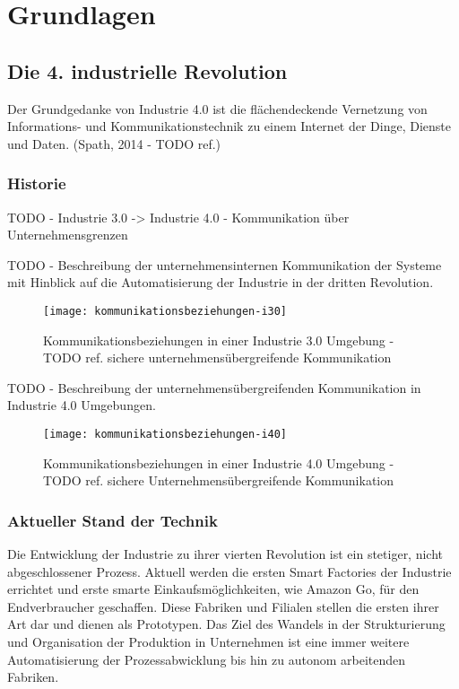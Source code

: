 \chapter{Grundlagen}

\section{Die 4. industrielle Revolution}

Der Grundgedanke von Industrie 4.0 ist die flächendeckende Vernetzung von Informations- und Kommunikationstechnik zu einem Internet der Dinge, Dienste und Daten. (Spath, 2014 - TODO ref.)

\subsection{Historie}
TODO - Industrie 3.0 -> Industrie 4.0 - Kommunikation über Unternehmensgrenzen

TODO - Beschreibung der unternehmensinternen Kommunikation der Systeme mit Hinblick auf die Automatisierung der Industrie in der dritten Revolution.

\begin{figure}[h]
  \centering
  \texttt{[image: kommunikationsbeziehungen-i30]}
  \caption{Kommunikationsbeziehungen in einer Industrie 3.0 Umgebung - TODO ref. sichere unternehmensübergreifende Kommunikation}
  \label{Kap2:Industrie3.0-Kommunikation}
\end{figure}

\clearpage

TODO - Beschreibung der unternehmensübergreifenden Kommunikation in Industrie 4.0 Umgebungen.

\begin{figure}[h]
  \centering
  \texttt{[image: kommunikationsbeziehungen-i40]}
  \caption{Kommunikationsbeziehungen in einer Industrie 4.0 Umgebung - TODO ref. sichere Unternehmensübergreifende Kommunikation}
  \label{Kap2:Industrie4.0-Kommunikation}
\end{figure}

\clearpage

\subsection{Aktueller Stand der Technik}
Die Entwicklung der Industrie zu ihrer vierten Revolution ist ein stetiger, nicht abgeschlossener Prozess. Aktuell werden die ersten Smart Factories der Industrie errichtet und erste smarte Einkaufsmöglichkeiten, wie Amazon Go, für den Endverbraucher geschaffen. Diese Fabriken und Filialen stellen die ersten ihrer Art dar und dienen als Prototypen. Das Ziel des Wandels in der Strukturierung und Organisation der Produktion in Unternehmen ist eine immer weitere Automatisierung der Prozessabwicklung bis hin zu autonom arbeitenden Fabriken.

